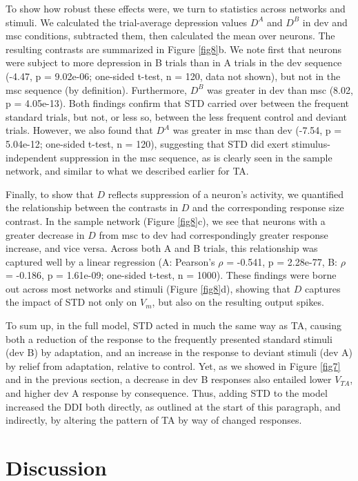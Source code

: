 \documentclass[pdflatex,referee,iicol,sn-basic]{sn-jnl}
\theoremstyle{thmstyleone}%
\theoremstyle{thmstyletwo}%
\theoremstyle{thmstylethree}%
\begin{document}
To show how robust these effects were, we turn to statistics across networks and stimuli. We calculated the trial-average depression values $D^A$ and $D^B$ in dev and msc conditions, subtracted them, then calculated the mean over neurons. The resulting contrasts are summarized in Figure \ref{fig8}b. We note first that neurons were subject to more depression in B trials than in A trials in the dev sequence (-4.47, p = 9.02e-06; one-sided t-test, n = 120, data not shown), but not in the msc sequence (by definition). Furthermore, $D^B$ was greater in dev than msc (8.02, p = 4.05e-13). Both findings confirm that STD carried over between the frequent standard trials, but not, or less so, between the less frequent control and deviant trials.
However, we also found that $D^A$ was greater in msc than dev (-7.54, p = 5.04e-12; one-sided t-test, n = 120), suggesting that STD did exert stimulus-independent suppression in the msc sequence, as is clearly seen in the sample network, and similar to what we described earlier for TA.

Finally, to show that $D$ reflects suppression of a neuron's activity, we quantified the relationship between the contrasts in $D$ and the corresponding response size contrast. In the sample network (Figure \ref{fig8}c), we see that neurons with a greater decrease in $D$ from msc to dev had correspondingly greater response increase, and vice versa. Across both A and B trials, this relationship was captured well by a linear regression (A: Pearson's $\rho$ = -0.541, p = 2.28e-77, B: $\rho$ = -0.186, p = 1.61e-09; one-sided t-test, n = 1000). These findings were borne out across most networks and stimuli (Figure \ref{fig8}d), showing that $D$ captures the impact of STD not only on $V_m$, but also on the resulting output spikes.

To sum up, in the full model, STD acted in much the same way as TA, causing both a reduction of the response to the frequently presented standard stimuli (dev B) by adaptation, and an increase in the response to deviant stimuli (dev A) by relief from adaptation, relative to control. Yet, as we showed in Figure \ref{fig7} and in the previous section, a decrease in dev B responses also entailed lower $V_{TA}$, and higher dev A response by consequence. Thus, adding STD to the model increased the DDI both directly, as outlined at the start of this paragraph, and indirectly, by altering the pattern of TA by way of changed responses.

\section{Discussion}\label{sec-discussion}
\end{document}

